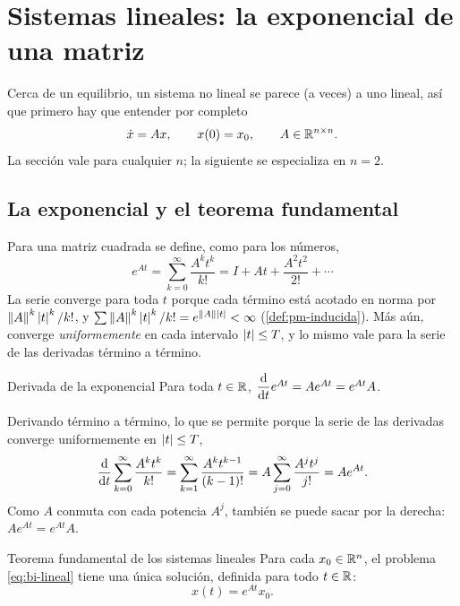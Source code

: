 \section{Sistemas lineales: la exponencial de una matriz}
\label{sec:bi-lineales}

Cerca de un equilibrio, un sistema no lineal se parece (a veces) a uno lineal, así que primero hay que entender por completo
\begin{equation}
  \dot x=Ax,\qquad x(0)=x_0,\qquad A\in\mathbb{R}^{n\times n} .
  \label{eq:bi-lineal}
\end{equation}
La sección vale para cualquier $n$; la siguiente se especializa en $n=2$.

\subsection{La exponencial y el teorema fundamental}

Para una matriz cuadrada se define, como para los números,
\begin{equation}
  e^{At}=\sum_{k=0}^{\infty}\frac{A^kt^k}{k!}=I+At+\frac{A^2t^2}{2!}+\cdots
  \label{eq:bi-exponencial}
\end{equation}
La serie converge para toda $t$ porque cada término está acotado en norma por $\left\lVert A\right\rVert^k\left\lvert t\right\rvert^k/k!$, y $\sum\left\lVert A\right\rVert^k\left\lvert t\right\rvert^k/k!=e^{\left\lVert A\right\rVert\left\lvert t\right\rvert}<\infty$ (\cref{def:pm-inducida}). Más aún, converge \emph{uniformemente} en cada intervalo $\left\lvert t\right\rvert\le T$, y lo mismo vale para la serie de las derivadas término a término.

\begin{lema}[label=lem:bi-derivada]{Derivada de la exponencial}
Para toda $t\in\mathbb{R}$, $\dfrac{\mathrm{d}}{\mathrm{d} t}e^{At}=Ae^{At}=e^{At}A$.
\end{lema}

\begin{demostracion}
Derivando término a término, lo que se permite porque la serie de las derivadas converge uniformemente en $\left\lvert t\right\rvert\le T$,
\[
  \frac{\mathrm{d}}{\mathrm{d} t}\sum_{k=0}^{\infty}\frac{A^kt^k}{k!}=\sum_{k=1}^{\infty}\frac{A^kt^{k-1}}{(k-1)!}=A\sum_{j=0}^{\infty}\frac{A^jt^j}{j!}=Ae^{At} .
\]
Como $A$ conmuta con cada potencia $A^j$, también se puede sacar por la derecha: $Ae^{At}=e^{At}A$.
\end{demostracion}

\begin{teorema}[label=thm:bi-fundamental]{Teorema fundamental de los sistemas lineales}
Para cada $x_0\in\mathbb{R}^n$, el problema \eqref{eq:bi-lineal} tiene una única solución, definida para todo $t\in\mathbb{R}$:
\[
  x(t)=e^{At}x_0 .
\]
\end{teorema}

